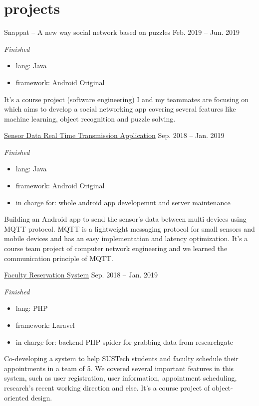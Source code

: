 \documentclass[hidelinks__VERSION__]{adamyi-cv}
\begin{document}
\pagebreak


\section{projects}

\begin{entrylist}


\entry
{Snappat -- A new way social network based on puzzles}
{Feb. 2019 -- Jun. 2019}
{\emph{Finished}
\begin{itemize}
    \item lang: Java
    \item framework: Android Original
\end{itemize}
It's a course project (software engineering) I and my teammates are focusing on which aims to develop a social networking app covering several features like machine learning, object recognition and puzzle solving.
}


\entry
{\href{https://github.com/hackroid/MqttSensorDemo}{Sensor Data Real Time Transmission Application}}
{Sep. 2018 -- Jan. 2019}
{\emph{Finished}
\begin{itemize}
    \item lang: Java
    \item framework: Android Original
    \item in charge for: whole android app developemnt and server maintenance
\end{itemize}
Building an Android app to send the sensor's data between multi devices using MQTT protocol. MQTT is a lightweight messaging protocol for small sensors and mobile devices and has an easy implementation and latency optimization. It's a course team project of computer network engineering and we learned the communication principle of MQTT.
}


\entry
{\href{https://github.com/zhaoweizhong/Faculty-Reservation}{Faculty Reservation System}}
{Sep. 2018 -- Jan. 2019}
{\emph{Finished}
\begin{itemize}
    \item lang: PHP
    \item framework: Laravel
    \item in charge for: backend PHP spider for grabbing data from researchgate
\end{itemize}
Co-developing a system to help SUSTech students and faculty schedule their appointments in a team of 5. We covered several important features in this system, such as user registration, user information, appointment scheduling, research's recent working direction and else. It's a course project of object-oriented design.
}



\end{entrylist}
\end{document}
